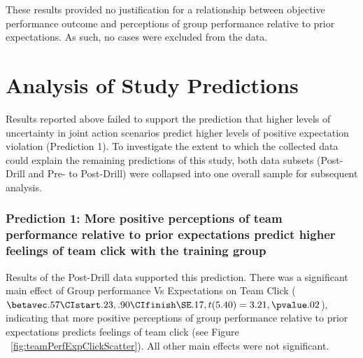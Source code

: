 These results provided no justification for a relationship between objective performance outcome and perceptions of group performance relative to prior expectations.  As such, no cases were excluded from the data.

\section{Analysis of Study Predictions\label{sect:resultsStudyPredictions}}




Results reported above failed to support the prediction that higher levels of uncertainty in joint action scenarios predict higher levels of positive expectation violation (Prediction 1).  To investigate the extent to which the collected data could explain the remaining predictions of this study, both data subsets (Post-Drill and Pre- to Post-Drill) were collapsed into one overall sample for subsequent analysis.



\subsubsection{Prediction 1: More positive perceptions of team performance relative to prior expectations predict higher feelings of team click with the training group}

Results of the Post-Drill data supported this prediction. There was a significant main effect of Group performance Vs Expectations on Team Click ($\betavec .57 \CIstart .23, .90 \CIfinish \SE .17, t(5.40) = 3.21, \pvalue .02$), indicating that more positive perceptions of group performance relative to prior expectations predicts feelings of team click (see Figure ~\ref{fig:teamPerfExpClickScatter}).  All other main effects were not significant.


